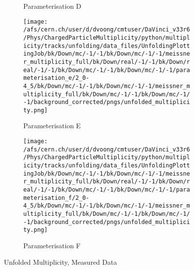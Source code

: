 \begin{figure}[h]
\begin{subfigure}{0.49\textwidth}
		\caption{Parameterisation D}
	\end{subfigure}
	\begin{subfigure}{0.49\textwidth}
		\texttt{[image: /afs/cern.ch/user/d/dvoong/cmtuser/DaVinci\_v33r6/Phys/ChargedParticleMultiplicity/python/multiplicity/tracks/unfolding/data\_files/UnfoldingPlottingJob/bk/Down/mc/-1/-1/bk/Down/mc/-1/-1/meissner\_multiplicity\_full/bk/Down/real/-1/-1/bk/Down/real/-1/-1/bk/Down/mc/-1/-1/bk/Down/mc/-1/-1/parameterisation\_e/2\_0-4\_5/bk/Down/mc/-1/-1/bk/Down/mc/-1/-1/meissner\_multiplicity\_full/bk/Down/mc/-1/-1/bk/Down/mc/-1/-1/background\_corrected/pngs/unfolded\_multiplicity.png]}
		\caption{Parameterisation E}
	\end{subfigure}
	\begin{subfigure}{0.49\textwidth}
		\texttt{[image: /afs/cern.ch/user/d/dvoong/cmtuser/DaVinci\_v33r6/Phys/ChargedParticleMultiplicity/python/multiplicity/tracks/unfolding/data\_files/UnfoldingPlottingJob/bk/Down/mc/-1/-1/bk/Down/mc/-1/-1/meissner\_multiplicity\_full/bk/Down/real/-1/-1/bk/Down/real/-1/-1/bk/Down/mc/-1/-1/bk/Down/mc/-1/-1/parameterisation\_f/2\_0-4\_5/bk/Down/mc/-1/-1/bk/Down/mc/-1/-1/meissner\_multiplicity\_full/bk/Down/mc/-1/-1/bk/Down/mc/-1/-1/background\_corrected/pngs/unfolded\_multiplicity.png]}
		\caption{Parameterisation F}
	\end{subfigure}
	\caption{Unfolded Multiplicity, Measured Data}
	\label{fig: unfolded multiplicity, measured data}
\end{figure}

